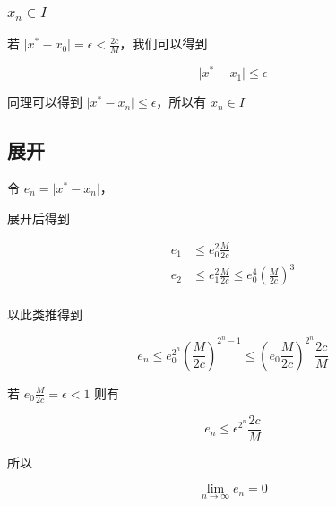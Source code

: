 \documentclass[12pt,a4paper]{ctexart}
\begin{document}
\subsubsection{$x_n \in I$}

若 $\lvert x^* - x_0 \rvert = \epsilon < \frac{2c}{M}$，我们可以得到

\[
\lvert x^* - x_1 \rvert \le \epsilon
\]

同理可以得到 $\lvert x^* - x_n \rvert \le \epsilon$，所以有 $x_n \in I$

\subsection{展开}

令 $e_n = \lvert x^* - x_n \rvert$，

展开后得到

\begin{align*}
e_1 & \le e_0^2 \frac{M}{2c} \\
e_2 & \le e_1^2 \frac{M}{2c} \le e_0^4 (\frac{M}{2c}) ^3\\
\end{align*}

以此类推得到

\[
e_{n} \le e_0^{2^n}(\frac{M}{2c})^{2^n - 1} \le (e_0 \frac{M}{2c})^{2^n} \frac{2c}{M}
\]

若 $e_0 \frac{M}{2c} = \epsilon < 1$ 则有

\[
e_{n} \le \epsilon ^{2^n} \frac{2c}{M}
\]

所以

\[
\lim_{n \to \infty}e_n = 0
\]
\end{document}
